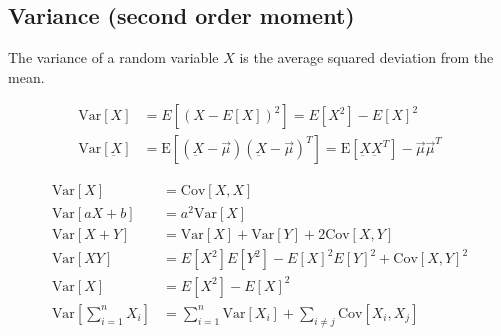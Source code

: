 \begin{mdframed}[style=eqbox]
  \subsection{Variance (second order moment)}
  The variance of a random variable $X$ is the average squared deviation from the mean.
  \begin{mdframed}[style=redbox]
    \begin{align*}
      \text{Var}[X] &= E[(X - E[X])^2] = E[X^2] - E[X]^2\\
      \text{Var}[\underbar{X}] &= \text{E}[(\underbar{X} - \vec{\mu})(\underbar{X} - \vec{\mu})^T] = \text{E}[\underbar{X}\underbar{X}^T] - \vec{\mu}\vec{\mu}^T
    \end{align*}
  \end{mdframed}
  \begin{align*}
    \text{Var}[X] &= \text{Cov}[X,X]\\
    \text{Var}[aX + b] &= a^2 \text{Var}[X]\\
    \text{Var}[X + Y] &= \text{Var}[X] + \text{Var}[Y] + 2\text{Cov}[X,Y]\\
    \text{Var}[XY] &= E[X^2]E[Y^2] - E[X]^2E[Y]^2 + \text{Cov}[X,Y]^2\\
    \text{Var}[X] &= E[X^2] - E[X]^2\\
    \text{Var}\left[\sum_{i=1}^n X_i\right] &= \sum_{i=1}^n \text{Var}[X_i] + \sum_{i \neq j} \text{Cov}[X_i, X_j]
  \end{align*}
\end{mdframed}

